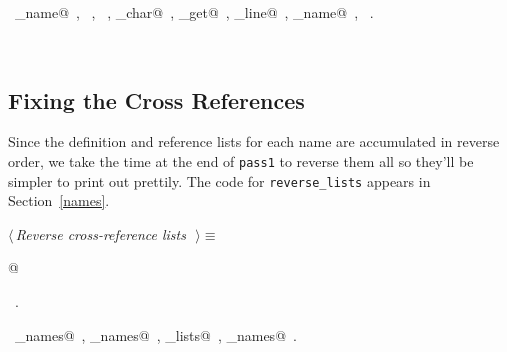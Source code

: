 \documentclass{report}
\begin{document}
\begin{flushleft}
\begin{minipage}{\linewidth}
\vspace{-2ex}
\footnotesize\addtolength{\baselineskip}{-1ex}
\begin{list}{}{\setlength{\itemsep}{-\parsep}\setlength{\itemindent}{-\leftmargin}}
\item \NWtxtIdentsUsed\nobreak\  \verb@command_name@\nobreak\ , \verb@exit@\nobreak\ , \verb@fprintf@\nobreak\ , \verb@nw_char@\nobreak\ , \verb@source_get@\nobreak\ , \verb@source_line@\nobreak\ , \verb@source_name@\nobreak\ , \verb@stderr@\nobreak\ .\end{list}
\end{minipage}\\[4ex]
\end{flushleft}
\subsection{Fixing the Cross References}

Since the definition and reference lists for each name are accumulated
in reverse order, we take the time at the end of \verb|pass1| to
reverse them all so they'll be simpler to print out prettily.
The code for \verb|reverse_lists| appears in Section~\ref{names}.
\begin{flushleft} \small
\begin{minipage}{\linewidth} \label{scrap43}
$\langle\,${\it Reverse cross-reference lists}\nobreak\ {\footnotesize {}}$\,\rangle\equiv$
\vspace{-1ex}
\begin{list}{}{} \item
\mbox{}@{\NWsep}
\end{list}
\vspace{-1ex}
\footnotesize\addtolength{\baselineskip}{-1ex}
\begin{list}{}{\setlength{\itemsep}{-\parsep}\setlength{\itemindent}{-\leftmargin}}
\item \NWtxtMacroRefIn\ .
\end{list}
\vspace{-2ex}
\footnotesize\addtolength{\baselineskip}{-1ex}
\begin{list}{}{\setlength{\itemsep}{-\parsep}\setlength{\itemindent}{-\leftmargin}}
\item \NWtxtIdentsUsed\nobreak\  \verb@file_names@\nobreak\ , \verb@macro_names@\nobreak\ , \verb@reverse_lists@\nobreak\ , \verb@user_names@\nobreak\ .\end{list}
\end{minipage}\\[4ex]
\end{flushleft}
\end{document}
